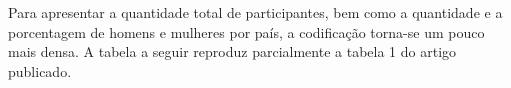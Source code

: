 \documentclass[
]{book}
\newenvironment{Shaded}{\begin{snugshade}}{\end{snugshade}}
\newcommand{\DataTypeTok}[1]{\textcolor[rgb]{0.13,0.29,0.53}{#1}}
\newcommand{\DecValTok}[1]{\textcolor[rgb]{0.00,0.00,0.81}{#1}}
\newcommand{\KeywordTok}[1]{\textcolor[rgb]{0.13,0.29,0.53}{\textbf{#1}}}
\newcommand{\NormalTok}[1]{#1}
\newcommand{\OperatorTok}[1]{\textcolor[rgb]{0.81,0.36,0.00}{\textbf{#1}}}
\newcommand{\StringTok}[1]{\textcolor[rgb]{0.31,0.60,0.02}{#1}}
\begin{document}
Para apresentar a quantidade total de participantes, bem como a quantidade e a porcentagem de homens e mulheres por país, a codificação torna-se um pouco mais densa. A tabela a seguir reproduz parcialmente a tabela 1 do artigo publicado.

\begin{Shaded}
\end{Shaded}
\end{document}
